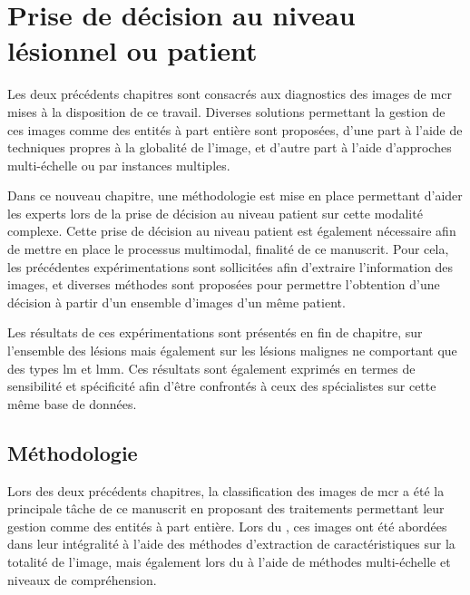 \renewcommand{\thechapter}{\arabic{chapter}}
\setcounter{chapter}{6}

\chapter{Prise de décision au niveau lésionnel ou patient}
\label{chap:chapter_7}
\chapterintro
Les deux précédents chapitres sont consacrés aux diagnostics des images de \acrlong {mcr} mises à la disposition de ce travail. Diverses solutions permettant la gestion de ces images comme des entités à part entière sont proposées, d'une part à l'aide de techniques propres à la globalité de l'image, et d'autre part à l'aide d'approches multi-échelle ou par instances multiples.\par

Dans ce nouveau chapitre, une méthodologie est mise en place permettant d'aider les experts lors de la prise de décision au niveau patient sur cette modalité complexe. Cette prise de décision au niveau patient est également nécessaire afin de mettre en place le processus multimodal, finalité de ce manuscrit. Pour cela, les précédentes expérimentations sont sollicitées afin d'extraire l'information des images, et diverses méthodes sont proposées pour permettre l'obtention d'une décision à partir d'un ensemble d'images d'un même patient.\par

Les résultats de ces expérimentations sont présentés en fin de chapitre, sur l'ensemble des lésions mais également sur les lésions malignes ne comportant que des types \acrlong{lm} et \acrlong{lmm}. Ces résultats sont également exprimés en termes de sensibilité et spécificité afin d'être confrontés à ceux des spécialistes sur cette même base de données.\par
\newpage

\section{Méthodologie}
\label{sec:patient_decision_methodology}
Lors des deux précédents chapitres, la classification des images de \gls{mcr} a été la principale tâche de ce manuscrit en proposant des traitements permettant leur gestion comme des entités à part entière. Lors du , ces images ont été abordées dans leur intégralité à l'aide des méthodes d'extraction de caractéristiques sur la totalité de l'image, mais également lors du  à l'aide de méthodes multi-échelle et niveaux de compréhension.\par

